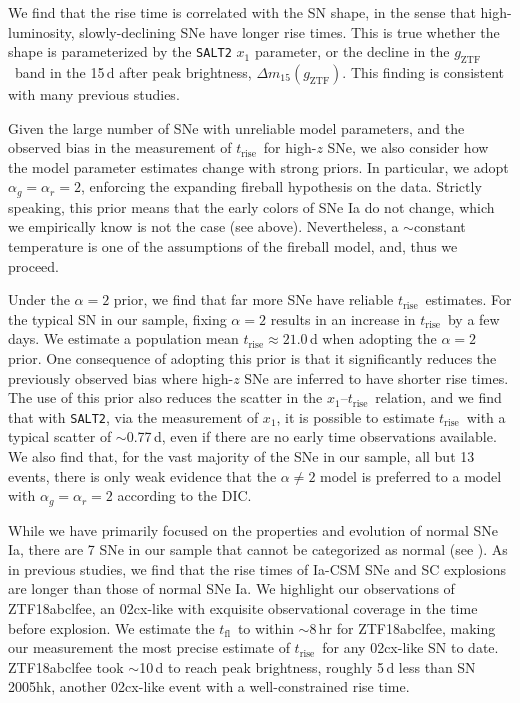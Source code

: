 \documentclass[twocolumn]{./aastex63}
\newcommand{\gztf}{$g_\mathrm{ZTF}$}
\newcommand{\tfl}{$t_\mathrm{fl}$}
\newcommand{\trise}{$t_\mathrm{rise}$}
\begin{document}
We find that the rise time is correlated with the SN shape, in the sense that
high-luminosity, slowly-declining SNe have longer rise times. This is true
whether the shape is parameterized by the \texttt{SALT2} $x_1$ parameter, or the
decline in the \gztf\ band in the 15\,d after peak brightness, $\Delta
m_{15}(g_\mathrm{ZTF})$. This finding is consistent with many previous studies.

Given the large number of SNe with unreliable model parameters, and the observed
bias in the measurement of \trise\ for high-$z$ SNe, we also consider how the
model parameter estimates change with strong priors. In particular, we adopt
$\alpha_g = \alpha_r = 2$, enforcing the expanding fireball hypothesis on the
data. Strictly speaking, this prior means that the early colors of SNe Ia do not
change, which we empirically know is not the case (see above). Nevertheless, a
$\sim$constant temperature is one of the assumptions of the fireball model, and,
thus we proceed.

Under the $\alpha = 2$ prior, we find that far more SNe have reliable \trise\
estimates. For the typical SN in our sample, fixing $\alpha = 2$ results in an
increase in \trise\ by a few days. We estimate a population mean \trise$ \approx
21.0$\,d when adopting the $\alpha = 2$ prior. One consequence of adopting this
prior is that it significantly reduces the previously observed bias where
high-$z$ SNe are inferred to have shorter rise times. The use of this prior also
reduces the scatter in the $x_1$--\trise\ relation, and we find that with
\texttt{SALT2}, via the measurement of $x_1$, it is possible to estimate \trise\
with a typical scatter of $\sim$0.77\,d, even if there are no early time
observations available. We also find that, for the vast majority of the SNe in
our sample, all but 13 events, there is only weak evidence that the $\alpha \ne
2$ model is preferred to a model with $\alpha_g = \alpha_r = 2$ according to the
DIC.

While we have primarily focused on the properties and evolution of normal SNe Ia,
there are 7 SNe in our sample that cannot be categorized as normal (see
\citealt{Yao19}). As in previous studies, we find that the rise times of Ia-CSM
SNe and SC explosions are longer than those of normal SNe Ia. We highlight our
observations of ZTF18abclfee, an 02cx-like with exquisite observational coverage
in the time before explosion. We estimate the \tfl\ to within $\sim$8\,hr for
ZTF18abclfee, making our measurement the most precise estimate of \trise\ for
any 02cx-like SN to date. ZTF18abclfee took $\sim$10\,d to reach peak
brightness, roughly 5\,d less than SN\,2005hk, another 02cx-like event with a
well-constrained rise time.
\end{document}
